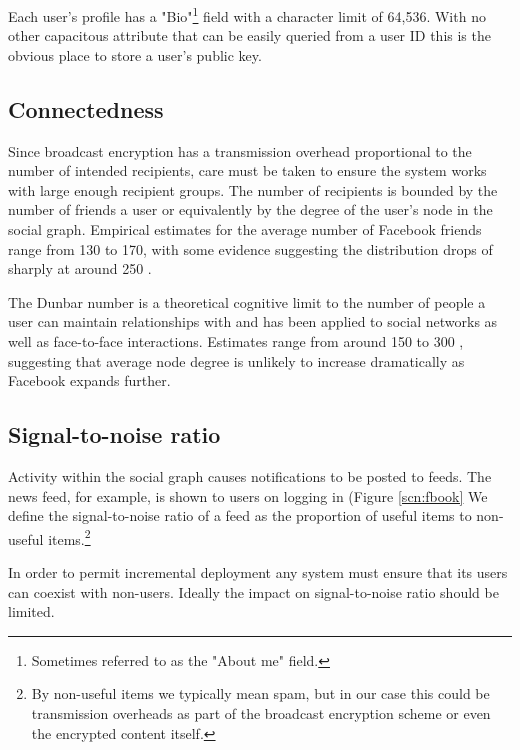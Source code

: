 Each user's profile has a "Bio"\footnote{Sometimes referred to as the "About me" field.} field with a character limit of 64,536. With no other capacitous attribute that can be easily queried from a user ID this is the obvious place to store a user's public key.

    
\subsection{Connectedness}
\label{sec:cness}

Since broadcast encryption has a transmission overhead proportional to the number of intended recipients, care must be taken to ensure the system works with large enough recipient groups. The number of recipients is bounded by the number of friends a user or equivalently by the degree of the user's node in the social graph. Empirical estimates for the average number of Facebook friends range from 130 to 170, with some evidence suggesting the distribution drops of sharply at around 250 \cite{fb-factsheet} \cite{fb-connectedness}.

The Dunbar number is a theoretical cognitive limit to the number of people a user can maintain relationships with and has been applied to social networks as well as face-to-face interactions. Estimates range from around 150 to 300 \cite{dunbar} \cite{socnetsize}, suggesting that average node degree is unlikely to increase dramatically as Facebook expands further.


\subsection{Signal-to-noise ratio}
\label{sec:signoise}

Activity within the social graph causes notifications to be posted to feeds. The news feed, for example, is shown to users on logging in (Figure \ref{scn:fbook}  We define the signal-to-noise ratio of a feed as the proportion of useful items to non-useful items.\footnote{By non-useful items we typically mean spam, but in our case this could be transmission overheads as part of the broadcast encryption scheme or even the encrypted content itself.}

In order to permit incremental deployment any system must ensure that its users can coexist with non-users. Ideally the impact on signal-to-noise ratio should be limited.

